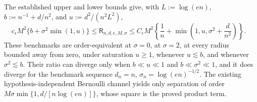 The established upper and lower bounds give, with \(L:=\log(en)\), \(b:=n^{-1}+d/n^2\), and \(u:=d^2/(n^2L^2)\),
\[
 c_{\epsilon}M^2\{b+\sigma^2\min(1,u)\}
 \le \mathsf R_{n,d,\epsilon,M,\sigma}
 \le C_{\epsilon}M^2\left\{\frac1n+\min\left(1,u,\sigma^2+\frac d{n^2}\right)\right\}.
\]
These benchmarks are order-equivalent at \(\sigma=0\), at \(\sigma=2\), at every radius bounded away from zero, under saturation \(u\ge1\), whenever \(u\lesssim b\), and whenever \(\sigma^2\lesssim b\).  Their ratio can diverge only when \(b\ll u\ll1\) and \(b\ll\sigma^2\ll1\), and it does diverge for the benchmark sequence \(d_n=n\), \(\sigma_n=\log(en)^{-1/2}\).  The existing hypothesis-independent Bernoulli channel yields only separation of order \(M\sigma\min\{1,d/[n\log(en)]\}\), whose square is the proved product term.